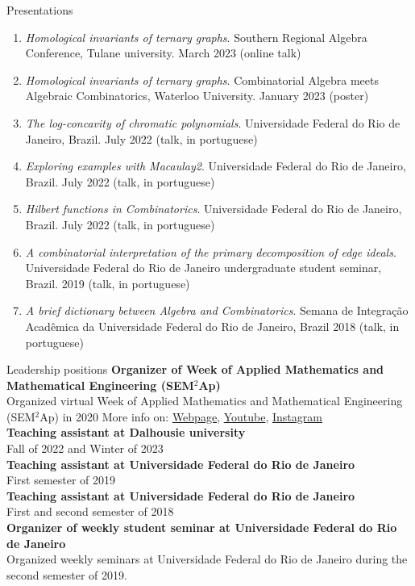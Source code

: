 \documentclass{resume} %
\begin{document}
\begin{rSection}{Presentations}
\begin{enumerate}[label={}]
        \item \textit{Homological invariants of ternary graphs}. Southern Regional Algebra Conference, Tulane university. March 2023 (online talk)
        \item \textit{Homological invariants of ternary graphs}. Combinatorial Algebra meets Algebraic Combinatorics, Waterloo University. January 2023 (poster)
        \item \textit{The log-concavity of chromatic polynomials}. Universidade Federal do Rio de Janeiro, Brazil. July 2022 (talk, in portuguese)
        \item \textit{Exploring examples with Macaulay2}. Universidade Federal do Rio de Janeiro, Brazil. July 2022 (talk, in portuguese)
        \item \textit{Hilbert functions in Combinatorics}. Universidade Federal do Rio de Janeiro, Brazil. July 2022 (talk, in portuguese)
        \item \textit{A combinatorial interpretation of the primary decomposition of edge ideals}. Universidade Federal do Rio de Janeiro undergraduate student seminar, Brazil. 2019 (talk, in portuguese)
        \item \textit{A brief dictionary between Algebra and Combinatorics}. Semana de Integração Acadêmica da Universidade Federal do Rio de Janeiro, Brazil 2018 (talk, in portuguese)
    \end{enumerate}
\end{rSection}

\begin{rSection}{Leadership positions}
{\bf Organizer of Week of Applied Mathematics and Mathematical Engineering (SEM$^2$Ap)}
\\
Organized virtual Week of Applied Mathematics and Mathematical Engineering (SEM$^2$Ap) in 2020
{\scriptsize More info on:  \href{http://semap.rio.br/2020/en/}{Webpage},   \href{https://www.youtube.com/channel/UC14NMQ5cOsSuLrAQGGa2T4Q}{Youtube}, 
\href{https://www.instagram.com/semap.rio/}{Instagram}}
\\
{\bf Teaching assistant at Dalhousie university}
\\
Fall of 2022 and Winter of 2023
\\
{\bf Teaching assistant at Universidade Federal do Rio de Janeiro} 
\\
First semester of 2019
\\
{\bf Teaching assistant at Universidade Federal do Rio de Janeiro} 
\\
First and second semester of 2018
\\
{\bf Organizer of weekly student seminar at Universidade Federal do Rio de Janeiro}
\\
Organized weekly seminars at Universidade Federal do Rio de Janeiro during the second semester of 2019.
\end{rSection}
\end{document}
